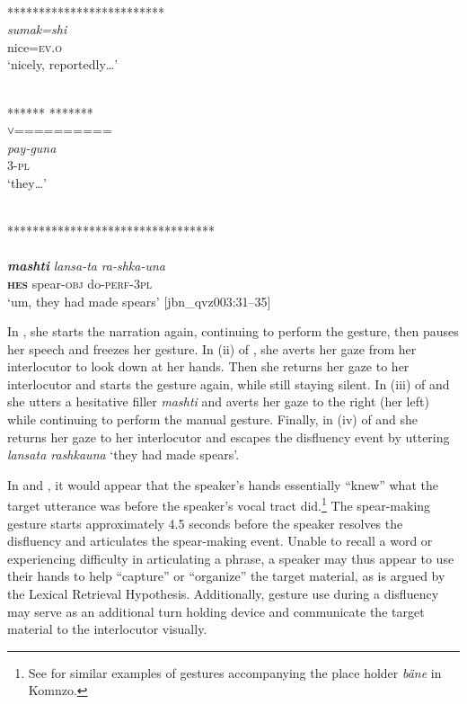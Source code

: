\documentclass[output=paper]{langscibook}
\begin{document}
\ex  \label{ex:rice:29b}
\\
*************************\\
{{\textit{sumak=shi{\hspace{1mm}}}{}}} \\
{nice=\textsc{ev.o}}\\
\glt  ‘nicely, reportedly…’
\medskip

\ex \label{ex:rice:29c} 
 {}\\
{******} {\hspace{14mm}*******}\\
{} {˅==========}\\
{\textit{pay-guna}} {}\\
{3-\textsc{pl}} {}\\
\glt  ‘they…’
\medskip

\ex  \label{ex:rice:29d}
 {\hspace{5mm}}\\
\glt **********************************\\
\glll {====>} {} {} \\
{\textbf{\textit{mashti}}} {\textit{lansa-ta}}  {\textit{{ra-shka-una}}}\\
{\textbf{\textsc{hes}}} {spear-\textsc{obj}} {do-\textsc{perf-3pl}}\\
\glt ‘um, they had made spears’ [jbn\_qvz003:31--35]
\z
\z

In , she starts the narration again, continuing to perform the gesture, then pauses her speech and freezes her gesture. In (ii) of , she averts her gaze from her interlocutor to look down at her hands. Then she returns her gaze to her interlocutor and starts the gesture again, while still staying silent. In (iii) of  and  she utters a hesitative filler \textit{mashti} and averts her gaze to the right (her left) while continuing to perform the manual gesture. Finally, in (iv) of  and  she returns her gaze to her interlocutor and escapes the disfluency event by uttering \textit{lansata rashkauna} ‘they had made spears’.

In  and , it would appear that the speaker’s hands essentially “knew” what the target utterance was before the speaker’s vocal tract did.\footnote{See \citet{chapters/doehler} for similar examples of gestures accompanying the place holder {\textit{bäne}} in Komnzo.} The spear-making gesture starts approximately 4.5 seconds before the speaker resolves the disfluency and articulates the spear-making event. Unable to recall a word or experiencing difficulty in articulating a phrase, a speaker may thus appear to use their hands to help “capture” or “organize” the target material, as is argued by the Lexical Retrieval Hypothesis. Additionally, gesture use during a disfluency may serve as an additional turn holding device and communicate the target material to the interlocutor visually.  
\end{document}

